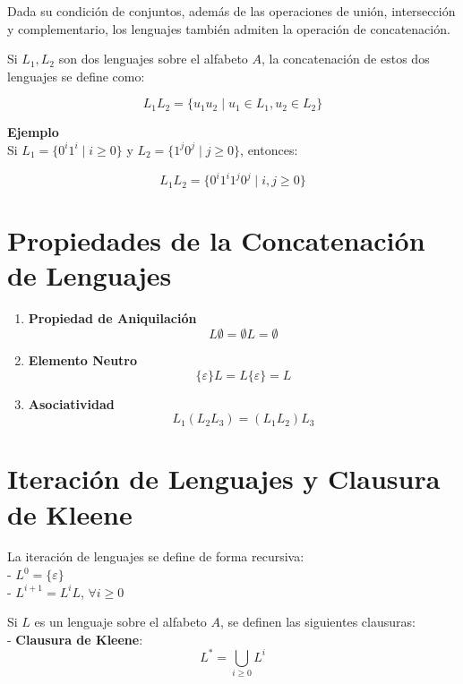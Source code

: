 \documentclass[12pt]{report} %
\begin{document}
Dada su condición de conjuntos, además de las operaciones de unión,
intersección y complementario, los lenguajes también admiten la
operación de concatenación.

Si \(L_1, L_2\) son dos lenguajes sobre el alfabeto \(A\), la
concatenación de estos dos lenguajes se define como:

\[
L_1L_2 = \{u_1u_2 \mid u_1 \in L_1, u_2 \in L_2\}
\]

\textbf{Ejemplo}\\
Si \(L_1 = \{0^i1^i \mid i \geq 0\}\) y
\(L_2 = \{1^j0^j \mid j \geq 0\}\), entonces:

\[
L_1L_2 = \{0^i1^i1^j0^j \mid i, j \geq 0\}
\]

\hypertarget{propiedades-de-la-concatenaciuxf3n-de-lenguajes}{%
\section{Propiedades de la Concatenación de
Lenguajes}\label{propiedades-de-la-concatenaciuxf3n-de-lenguajes}}

\begin{enumerate}
\def\labelenumi{\arabic{enumi}.}
\item
  \textbf{Propiedad de Aniquilación}\\
  \[L \emptyset = \emptyset L = \emptyset\]
\item
  \textbf{Elemento Neutro}\\
  \[\{\varepsilon\}L = L\{\varepsilon\} = L\]
\item
  \textbf{Asociatividad}\\
  \[L_1(L_2L_3) = (L_1L_2)L_3\]
\end{enumerate}

\hypertarget{iteraciuxf3n-de-lenguajes-y-clausura-de-kleene}{%
\section{Iteración de Lenguajes y Clausura de
Kleene}\label{iteraciuxf3n-de-lenguajes-y-clausura-de-kleene}}

La iteración de lenguajes se define de forma recursiva:\\
- \(L^0 = \{\varepsilon\}\)\\
- \(L^{i+1} = L^iL\), \(\forall i \geq 0\)

Si \(L\) es un lenguaje sobre el alfabeto \(A\), se definen las
siguientes clausuras:\\
- \textbf{Clausura de Kleene}:\\
\[
    L^* = \bigcup_{i \geq 0} L^i
    \]
\end{document}

